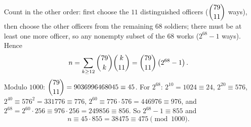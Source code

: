 Count in the other order: first choose the $11$ distinguished officers ($\dbinom{79}{11}$ ways), then choose the other officers from the remaining $68$ soldiers; there must be at least one more officer, so any nonempty subset of the $68$ works ($2^{68}-1$ ways). Hence
\[
n=\sum_{k\ge12}\dbinom{79}{k}\dbinom{k}{11}=\dbinom{79}{11}\left(2^{68}-1\right).
\]
Modulo $1000$: $\dbinom{79}{11}=9036996468045\equiv45$. For $2^{68}$: $2^{10}=1024\equiv24$, $2^{20}\equiv576$, $2^{40}\equiv576^2=331776\equiv776$, $2^{60}\equiv776\cdot576=446976\equiv976$, and $2^{68}=2^{60}\cdot256\equiv976\cdot256=249856\equiv856$. So $2^{68}-1\equiv855$ and
\[
n\equiv45\cdot855=38475\equiv\boxed{475}\pmod{1000}.
\]
